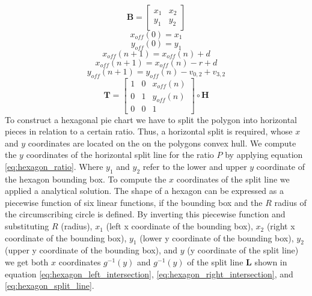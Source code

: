 		\begin{equation}
		\label{eq:hexagon_bounds}
			\mathbf{B} =
				\begin{bmatrix}
				x_1 & x_2 \\
				y_1 & y_2
			\end{bmatrix}
		\end{equation}
		\begin{equation}
		\label{eq:hexagon_x_off_start}
			x_{off}(0)=x_1
		\end{equation}
		\begin{equation}
		\label{eq:hexagon_y_off_start}
			y_{off}(0)=y_1
		\end{equation}
		\begin{equation}
		\label{eq:hexagon_x_off_even}
			x_{off}(n+1)=x_{off}(n)+d
		\end{equation}
		\begin{equation}
		\label{eq:hexagon_x_off_odd}
			x_{off}(n+1)=x_{off}(n)-r+d
		\end{equation}
		\begin{equation}
		\label{eq:hexagon_y_off}
			y_{off}(n+1)=y_{off}(n)-v_{0,2}+v_{3,2}
		\end{equation}
		\begin{equation}
		\label{eq:hexagon_translate}
		\mathbf{T} =
			\begin{bmatrix}
				1 & 0 & x_{off}(n) \\
				0 & 1 & y_{off}(n) \\
				0 & 0 & 1
			\end{bmatrix} \circ \mathbf{H}
		\end{equation}
		To construct a hexagonal pie chart we have to split the polygon into horizontal pieces in relation to a certain ratio. Thus, a horizontal split is required, whose $x$ and $y$ coordinates are located on the on the polygons convex hull. We compute the $y$ coordinates of the horizontal split line for the ratio $P$ by applying equation \ref{eq:hexagon_ratio}. Where $y_1$ and $y_2$ refer to the lower and upper $y$ coordinate of the hexagon bounding box. To compute the $x$ coordinates of the split line we applied a analytical solution. The shape of a hexagon can be expressed as a piecewise function of six linear functions, if the bounding box and the $R$ radius of the circumscribing circle is defined. By inverting this piecewise function and substituting $R$ (radius), $x_1$ (left x coordinate of the bounding box), $x_2$ (right x coordinate of the bounding box), $y_1$ (lower y coordinate of the bounding box), $y_2$ (upper y coordinate of the bounding box), and $y$ (y coordinate of the split line) we get both $x$ coordinates $g^{-1}(y)$ and $g^{-1}(y)$ of the split line $\mathbf{L}$ shown in equation \ref{eq:hexagon_left_intersection}, \ref{eq:hexagon_right_intersection}, and \ref{eq:hexagon_split_line}.
